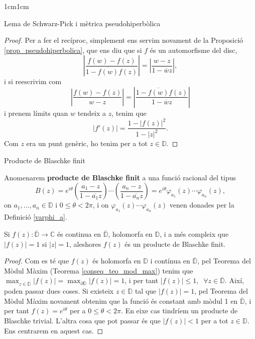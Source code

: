 \begin{adjustwidth}{1cm}{1cm}
\begin{subsection}{Lema de Schwarz-Pick i mètrica pseudohiperbòlica}
\begin{proof}
    Per a fer el recíproc, simplement ens servim novament de la Proposició \ref{prop_pseudohiperbolica}, que ens diu que si $f$ és un automorfisme del disc,
    \[
        \left|\frac{f(w)-f(z)}{1-\overline{f(w)}f(z)}\right|=\left|\frac{w-z}{1-\overline{w}z}\right|,
    \] i si reescrivim com
    \[
        \left|\frac{f(w)-f(z)}{w-z}\right|=\left|\frac{1-\overline{f(w)}f(z)}{1-\overline{w}z}\right|
    \] i prenem límits quan $w$ tendeix a $z$, tenim que
    \[
        |f'(z)|=\frac{1-|f(z)|^2}{1-|z|^2}.
    \] 
    Com $z$ era un punt genèric, ho tenim per a tot $z\in \mathbb{D}$.

\end{proof}

\end{subsection}

\begin{subsection}{Producte de Blaschke finit}

    \begin{definicio}
        Anomenarem \textbf{producte de Blaschke finit} a una funció racional del tipus 
        \[
            B(z)=e^{i\theta}\left(\frac{a_1-z}{1-\overline{a_1}z}\right)\cdots\left(\frac{a_n-z}{1-\overline{a_n}z}\right)=e^{i\theta}\varphi_{a_1}(z)\cdots \varphi_{a_n}(z),
        \]
        on $a_1,\dots, a_n\in \mathbb{D}$ i $0\leq \theta<2\pi$, i on $\varphi_{a_1}(z)\cdots \varphi_{a_n}(z)$ venen donades per la Definició \ref{varphi_a}.
    \end{definicio}

    \begin{proposicio}
        Si $f(z):\overline{\mathbb{D}}\to \mathbb{C}$ és continua en $\overline{\mathbb{D}}$, holomorfa en $\mathbb{D}$, i a més compleix que $|f(z)|=1$ si $|z|=1$, aleshores $f(z)$ és un producte de Blaschke finit.
    \end{proposicio}

    \begin{proof}
        Com es té que $f(z)$ és holomorfa en $\mathbb{D}$ i contínua en $\overline{\mathbb{D}}$, pel Teorema del Mòdul Màxim (Teorema \ref{conseq_teo_mod_max}) tenim que $\displaystyle\max_{z\in\overline{\mathbb{D}}}|f(z)|=\displaystyle\max_{\partial \mathbb{D}}|f(z)|=1$, i per tant $|f(z)|\leq 1, \;\; \forall z\in \overline{\mathbb{D}}$. Així, poden passar dues coses. Si existeix $z\in \mathbb{D}$ tal que $|f(z)|=1$, pel Teorema del Mòdul Màxim novament obtenim que la funció és constant amb mòdul 1 en $\overline{\mathbb{D}}$, i per tant $f(z)=e^{i\theta}$ per a $0\leq\theta<2\pi$. En eixe cas tindríem un producte de Blaschke trivial. L'altra cosa que pot passar és que $|f(z)|<1$ per a tot $z\in \mathbb{D}$. Ens centrarem en aquest cas.


\end{proof}
\end{subsection}
\end{adjustwidth}
